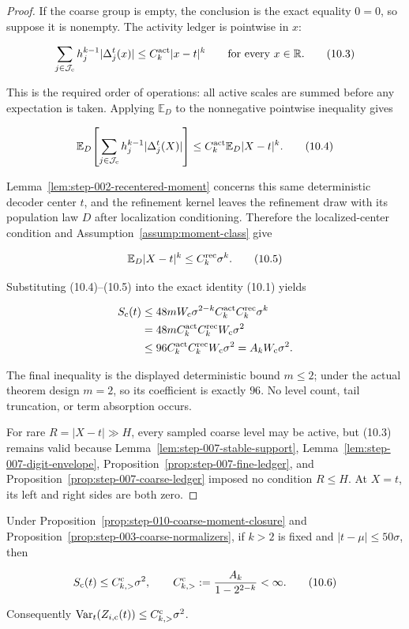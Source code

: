 \begin{proof}
If the coarse group is empty, the conclusion is
the exact equality \(0=0\), so suppose it is nonempty. The activity
ledger is pointwise in \(x\):

\[
\sum_{j\in\mathcal J_{\rm c}}h_j^{k-1}|\Delta_j^t(x)|
\leq C_k^{\rm act}|x-t|^k
\qquad\text{for every }x\in\mathbb R.
\tag{10.3}
\]

This is the required order of operations: all active scales are summed before
any expectation is taken. Applying \(\mathbb E_D\) to the nonnegative
pointwise inequality gives

\[
\mathbb E_D\!\left[
 \sum_{j\in\mathcal J_{\rm c}}h_j^{k-1}|\Delta_j^t(X)|
\right]
\leq C_k^{\rm act}\mathbb E_D|X-t|^k.
\tag{10.4}
\]

Lemma~\ref{lem:step-002-recentered-moment} concerns this same deterministic
decoder center \(t\), and the refinement kernel leaves the refinement draw
with its population law \(D\) after localization conditioning. Therefore the
localized-center condition and Assumption~\ref{assump:moment-class} give

\[
\mathbb E_D|X-t|^k\leq C_k^{\rm rec}\sigma^k.
\tag{10.5}
\]

Substituting (10.4)--(10.5) into the exact identity (10.1) yields

\[
\begin{aligned}
S_{\rm c}(t)
&\leq48mW_{\rm c}\sigma^{2-k}
  C_k^{\rm act}C_k^{\rm rec}\sigma^k\\
&=48mC_k^{\rm act}C_k^{\rm rec}W_{\rm c}\sigma^2\\
&\leq96C_k^{\rm act}C_k^{\rm rec}W_{\rm c}\sigma^2
=A_kW_{\rm c}\sigma^2.
\end{aligned}
\]

The final inequality is the displayed deterministic bound
\(m\leq2\); under the actual theorem design \(m=2\), so its coefficient is
exactly \(96\). No level count, tail truncation, or term absorption occurs.

For rare \(R=|X-t|\gg H\), every sampled coarse level may be active, but
(10.3) remains valid because Lemma~\ref{lem:step-007-stable-support}, Lemma~\ref{lem:step-007-digit-envelope}, Proposition~\ref{prop:step-007-fine-ledger}, and Proposition~\ref{prop:step-007-coarse-ledger} imposed no condition
\(R\leq H\). At \(X=t\), its left and right sides are both zero.
\end{proof}

\begin{lemma}\label{lem:step-010-superquadratic}
Under Proposition~\ref{prop:step-010-coarse-moment-closure} and Proposition~\ref{prop:step-003-coarse-normalizers}, if \(k>2\) is fixed
and \(|t-\mu|\leq50\sigma\), then

\[
S_{\rm c}(t)
\leq C_{k,>}^{\rm c}\sigma^2,
\qquad
C_{k,>}^{\rm c}
:=\frac{A_k}{1-2^{2-k}}<\infty.
\tag{10.6}
\]

Consequently
\(\operatorname{Var}_t(Z_{i,{\rm c}}(t))
\leq C_{k,>}^{\rm c}\sigma^2\).
\end{lemma}


